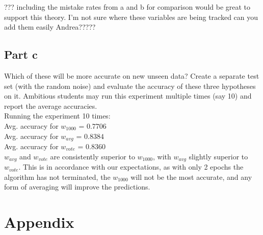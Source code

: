 \documentclass{article}
\begin{document}
??? including the mistake rates from a and b for comparison would be great to support this theory. I'm not sure where these variables are being tracked can you add them easily Andrea?????




\clearpage
\subsection*{Part c}

Which of these will be more accurate on new unseen data? Create a separate test set (with the random noise) and evaluate the accuracy of these three hypotheses on it. Ambitious students may run this experiment multiple times (say 10) and report the average accuracies.
\\
Running the experiment 10 times: \\
Avg. accuracy for $w_{1000}$ = $0.7706$ \\
Avg. accuracy for $w_{avg}$ = $0.8384$ \\
Avg. accuracy for $w_{vote}$ = $0.8360$ \\

\noindent $w_{avg}$ and $w_{vote}$ are consistently superior to $w_{1000}$, with $w_{avg}$ slightly superior to $w_{vote}$.
This is in accordance with our expectations, as with only 2 epochs the algorithm has not terminated, the $w_{1000}$ will not be the most accurate, and any form of averaging will improve the predictions. 
\clearpage
\section{Appendix}





\end{document}
